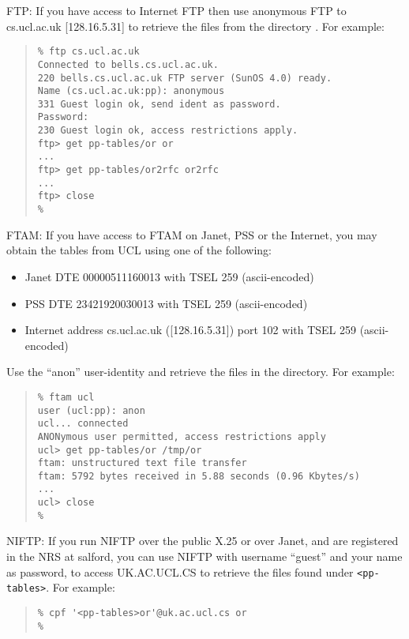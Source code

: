 \begin{describe}
\item[FTP:] If you have access to Internet FTP then use anonymous FTP
to cs.ucl.ac.uk [128.16.5.31] to retrieve the files from the directory
. For example:

\begin{quote}\small\begin{verbatim}
% ftp cs.ucl.ac.uk
Connected to bells.cs.ucl.ac.uk.
220 bells.cs.ucl.ac.uk FTP server (SunOS 4.0) ready.
Name (cs.ucl.ac.uk:pp): anonymous
331 Guest login ok, send ident as password.
Password:
230 Guest login ok, access restrictions apply.
ftp> get pp-tables/or or
...
ftp> get pp-tables/or2rfc or2rfc
...
ftp> close
%
\end{verbatim}\end{quote}

\item[FTAM:] If you have access to FTAM on Janet, PSS or the Internet,
you may obtain the tables from UCL using one of the following:
\begin{itemize}
\item Janet DTE 00000511160013 with TSEL 259 (ascii-encoded)
\item PSS DTE 23421920030013 with TSEL 259 (ascii-encoded)
\item Internet address cs.ucl.ac.uk ([128.16.5.31]) port 102 with TSEL
259 (ascii-encoded)
\end{itemize}
Use the ``anon'' user-identity and retrieve the files in the
 directory. For example:
\begin{quote}\small\begin{verbatim}
% ftam ucl
user (ucl:pp): anon
ucl... connected
ANONymous user permitted, access restrictions apply
ucl> get pp-tables/or /tmp/or
ftam: unstructured text file transfer
ftam: 5792 bytes received in 5.88 seconds (0.96 Kbytes/s)
...
ucl> close
%
\end{verbatim}\end{quote}

\item[NIFTP:] If you run NIFTP over the public X.25 or over Janet, and
are registered in the NRS at salford, you can use NIFTP with username
``guest'' and your name as password, to access UK.AC.UCL.CS to
retrieve the files found under \verb|<pp-tables>|. For example:
\begin{quote}\small\begin{verbatim}
% cpf '<pp-tables>or'@uk.ac.ucl.cs or
% 
\end{verbatim}\end{quote}


\end{describe}

